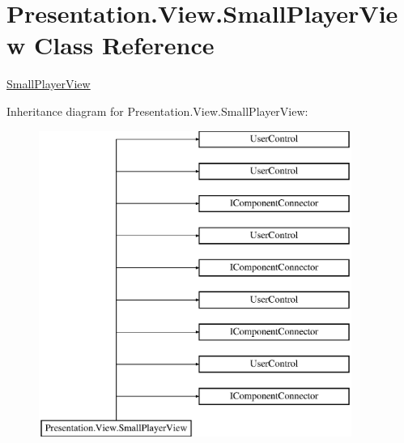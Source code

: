 \hypertarget{class_presentation_1_1_view_1_1_small_player_view}{}\section{Presentation.\+View.\+Small\+Player\+View Class Reference}
\label{class_presentation_1_1_view_1_1_small_player_view}


\hyperlink{class_presentation_1_1_view_1_1_small_player_view}{Small\+Player\+View}  


Inheritance diagram for Presentation.\+View.\+Small\+Player\+View\+:\begin{figure}[H]
\begin{center}
\leavevmode
\includegraphics[height=10.000000cm]{class_presentation_1_1_view_1_1_small_player_view}
\end{center}
\end{figure}
